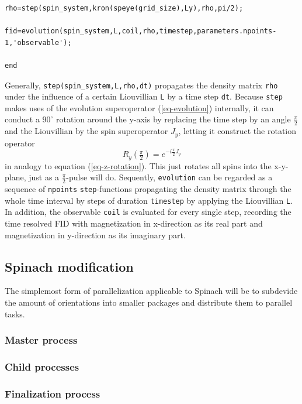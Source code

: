 \documentclass[11.5pt,a4paper]{article}
\begin{document}
\begin{lstlisting}[firstnumber=last]
% Apply the pulse
rho=step(spin_system,kron(speye(grid_size),Ly),rho,pi/2);

fid=evolution(spin_system,L,coil,rho,timestep,parameters.npoints-1,'observable');

end
\end{lstlisting}
Generally, \verb$step(spin_system,L,rho,dt)$ propagates the density matrix \verb$rho$ under the influence of a certain Liouvillian \verb$L$ by a time step \verb$dt$. Because \verb$step$ makes uses of the evolution superoperator (\ref{eq-evolution}) internally, it can conduct a $90^\circ$ rotation around the y-axis by replacing the time step by an angle $\tfrac{\pi}{2}$ and the Liouvillian by the spin superoperator $J_y$, letting it construct the rotation operator
\begin{equation}
 R_y (\tfrac{\pi}{2}) = e^{-i \tfrac{\pi}{2} J_y}
\end{equation}
in analogy to equation (\ref{eq-z-rotation}). This just rotates all spins into the x-y-plane, just as a $\tfrac{\pi}{2}$-pulse will do. 
Sequently, \verb$evolution$ can be regarded as a sequence of \verb$npoints$ \verb$step$-functions propagating the density matrix through the whole time interval by steps of duration \verb$timestep$ by applying the Liouvillian \verb$L$. In addition, the observable \verb$coil$ is evaluated for every single step, recording the time resolved FID with magnetization in x-direction as its real part and magnetization in y-direction as its imaginary part. 

\subsection{Spinach modification}
The simplemost form of parallelization applicable to Spinach will be to subdevide the amount of orientations into smaller packages and distribute them to parallel tasks. 
\subsubsection{Master process}
\subsubsection{Child processes}
\subsubsection{Finalization process}
\end{document}
